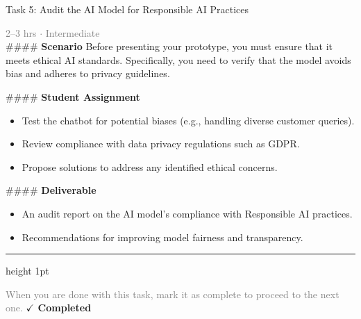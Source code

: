 \documentclass[10pt,a4paper]{article}
\begin{document}
\begin{taskbox}{Task 5: Audit the AI Model for Responsible AI Practices}

    {\small \textcolor{gray}{2--3 hrs $\cdot$ Intermediate}}\\[12pt]

    \#\#\#\# \textbf{Scenario}  
Before presenting your prototype, you must ensure that it meets ethical AI standards. Specifically, you need to verify that the model avoids bias and adheres to privacy guidelines.  

\#\#\#\# \textbf{Student Assignment}  
\begin{itemize}
    \item Test the chatbot for potential biases (e.g., handling diverse customer queries).  
    \item Review compliance with data privacy regulations such as GDPR.  
    \item Propose solutions to address any identified ethical concerns.  
\end{itemize}

\#\#\#\# \textbf{Deliverable}  
\begin{itemize}
    \item An audit report on the AI model’s compliance with Responsible AI practices.  
    \item Recommendations for improving model fairness and transparency.\par
\end{itemize}

    \vspace{16pt}

    \textcolor{cardBorder}{\hrule height 1pt}\vspace{8pt}

    \small \textcolor{gray}{When you are done with this task, mark it as complete to proceed to the next one.} \hfill \textbf{\textcolor{brandDark}{$\checkmark$ Completed}}

\end{taskbox}
\end{document}
